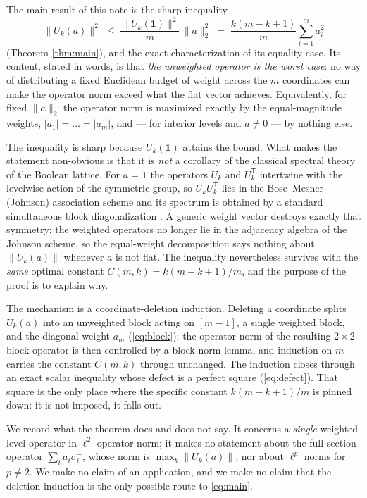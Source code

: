 \documentclass[11pt]{article}
\theoremstyle{remark}
\begin{document}
The main result of this note is the sharp inequality
\begin{equation}\label{eq:main}
\boxed{\;\|U_k(a)\|^2\;\le\;\frac{\|U_k(\mathbf 1)\|^2}{m}\,\|a\|_2^2
\;=\;\frac{k(m-k+1)}{m}\sum_{i=1}^m a_i^2\;}
\end{equation}
(Theorem \ref{thm:main}), and the exact characterization of its equality
case. Its content, stated in words, is that \emph{the unweighted operator
is the worst case}: no way of distributing a fixed Euclidean budget of
weight across the $m$ coordinates can make the operator norm exceed what
the flat vector achieves. Equivalently, for fixed $\|a\|_2$ the operator
norm is maximized exactly by the equal-magnitude weights,
$|a_1|=\dots=|a_m|$, and — for interior levels and $a\ne0$ — by nothing
else.

The inequality is sharp because $U_k(\mathbf 1)$ attains the bound. What
makes the statement non-obvious is that it is \emph{not} a corollary of
the classical spectral theory of the Boolean lattice. For $a=\mathbf 1$
the operators $U_k$ and $U_k^{\mathsf T}$ intertwine with the levelwise
action of the symmetric group, so $U_kU_k^{\mathsf T}$ lies in the
Bose--Mesner (Johnson) association scheme and its spectrum is obtained by
a standard simultaneous block diagonalization
\cite{bannai1984,srinivasan2011}. A generic weight vector destroys exactly
that symmetry: the weighted operators no longer lie in the adjacency
algebra of the Johnson scheme, so the equal-weight decomposition says
nothing about $\|U_k(a)\|$ whenever $a$ is not flat. The inequality
nevertheless survives with the \emph{same} optimal constant $C(m,k)=
k(m-k+1)/m$, and the purpose of the proof is to explain why.

The mechanism is a coordinate-deletion induction. Deleting a coordinate
splits $U_k(a)$ into an unweighted block acting on $[m-1]$, a single
weighted block, and the diagonal weight $a_m$ (\eqref{eq:block}); the
operator norm of the resulting $2\times 2$ block operator is then
controlled by a block-norm lemma, and induction on $m$ carries the
constant $C(m,k)$ through unchanged. The induction closes through an
exact scalar inequality whose defect is a perfect square
(\eqref{eq:defect}). That square is the only place where the specific
constant $k(m-k+1)/m$ is pinned down: it is not imposed, it falls out.

We record what the theorem does and does not say. It concerns a
\emph{single} weighted level operator in $\ell^2$-operator norm; it makes
no statement about the full section operator $\sum_i a_i\sigma_i^-$, whose
norm is $\max_k\|U_k(a)\|$, nor about $\ell^p$ norms for $p\ne2$. We make
no claim of an application, and we make no claim that the deletion
induction is the only possible route to \eqref{eq:main}.
\end{document}
